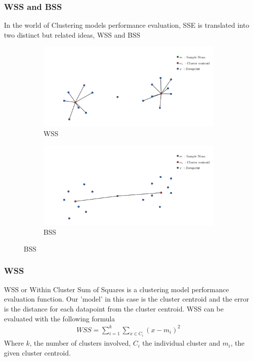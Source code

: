 \documentclass[12pt]{article}
\begin{document}
		 	\subsubsection*{WSS and BSS}
		 		In the world of Clustering models performance evaluation, SSE is translated into two distinct but related ideas\cite{???}, WSS and BSS
				\begin{figure}[H]
					\centering
					\begin{subfigure}{0.4\textwidth}
						\includegraphics[width=\textwidth]{res/WSS}
						\caption{WSS}
						\label{fig:first}
					\end{subfigure}
					\hfill
					\begin{subfigure}{0.4\textwidth}
					\includegraphics[width=\textwidth]{res/BSS}
						\caption{BSS}
						\label{fig:second}
					\end{subfigure}
					\hfill
					\label{fig:figures}
				\end{figure}
		 		\subsubsection*{WSS}
		 			WSS or  Within Cluster Sum of Squares is a clustering model performance evaluation function. Our 'model' in this case is the cluster centroid and the error is the distance for each datapoint from the cluster centroid. WSS can be evaluated with the following formula\cite{???}
		 			\begin{align}
						WSS = \sum_{i=1}^{k}{\sum_{x\in{C_i}}^{}{(x-m_i)^2}}
		 			\end{align}
	 				Where $k$, the number of clusters involved, $C_i$ the individual cluster and $m_i$, the given cluster centroid.
\end{document}
